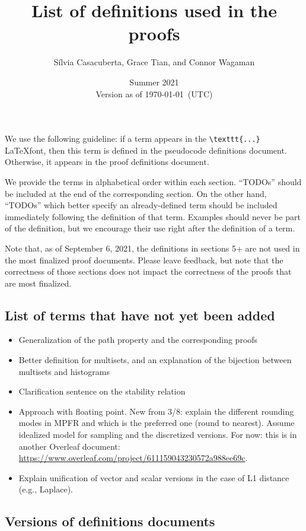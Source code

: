 \documentclass[11pt,a4paper]{article}
\title{List of definitions used in the proofs}
\author{S\'ilvia Casacuberta, Grace Tian, and Connor Wagaman}
\date{Summer 2021 \\ Version as of \today~(UTC)}
\theoremstyle{definition}
\begin{document}
\maketitle

We use the following guideline: if a term appears in the \texttt{\textbackslash\texttt{texttt\{...\}}} \LaTeX font, then this term is defined in the pseudocode definitions document. Otherwise, it appears in the proof definitions document. 

We provide the terms in alphabetical order within each section. ``TODOs'' should be included at the end of the corresponding section. On the other hand, ``TODOs'' which better specify an already-defined term should be included immediately following the definition of that term. Examples should never be part of the definition, but we encourage their use right after the definition of a term.

Note that, as of September 6, 2021, the definitions in sections 5+ are not used in the most finalized proof documents. Please leave feedback, but note that the correctness of those sections does not impact the correctness of the proofs that are most finalized.

\tableofcontents

\subsection{List of terms that have not yet been added}
\begin{itemize}
\item Generalization of the path property and the corresponding proofs
\item Better definition for multisets, and an explanation of the bijection between multisets and histograms
\item Clarification sentence on the stability relation
\item Approach with floating point. New from 3/8: explain the different rounding modes in MPFR and which is the preferred one (round to nearest). Assume idealized model for sampling and the discretized versions. For now: this is in another Overleaf document: \url{https://www.overleaf.com/project/611159043230572a988ee69c}.
\item Explain unification of vector and scalar versions in the case of L1 distance (e.g., Laplace).
\end{itemize}

\subsection{Versions of definitions documents}
\label{sec:versioned-docs}
\end{document}
